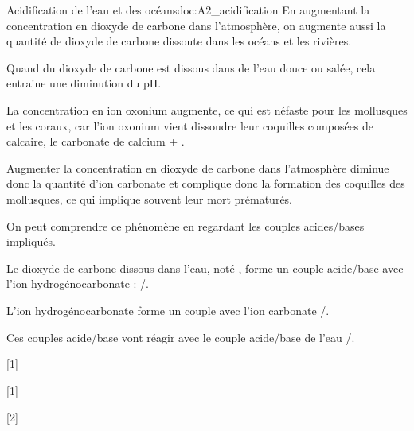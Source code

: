 \begin{doc}{Acidification de l'eau et des océans}{doc:A2_acidification}
  En augmentant la concentration en dioxyde de carbone dans l'atmosphère, on augmente aussi la quantité de dioxyde de carbone dissoute dans les océans et les rivières.
  
  \begin{importants}  
    Quand du dioxyde de carbone est dissous dans de l'eau douce ou salée, cela entraine une diminution du pH.
  \end{importants}
  
  La concentration en ion oxonium \oxonium augmente, ce qui est néfaste pour les mollusques et les coraux, car l'ion oxonium vient dissoudre leur coquilles composées de calcaire, le carbonate de calcium \ionCalcium + \carbonate.

  \begin{importants}
    Augmenter la concentration en dioxyde de carbone dans l'atmosphère diminue donc la quantité d'ion carbonate \carbonate et complique donc la formation des coquilles des mollusques, ce qui implique souvent leur mort prématurés.
  \end{importants}

  On peut comprendre ce phénomène en regardant les couples acides/bases impliqués.
  \begin{listePoints}
    \item Le dioxyde de carbone dissous dans l'eau, noté , forme un couple acide/base avec l'ion hydrogénocarbonate : /\bicarbonate.
    \item L'ion hydrogénocarbonate forme un couple avec l'ion carbonate \bicarbonate/\carbonate.
    \item Ces couples acide/base vont réagir avec le couple acide/base de l'eau \oxonium/\eau.
  \end{listePoints}
\end{doc}


[1]


[1]

[2]
